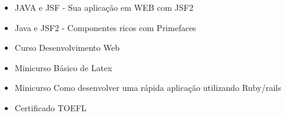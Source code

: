 












\smallskip
\begin{itemize}
\item JAVA e JSF - Sua aplicação em WEB com JSF2
\smallskip
\item  Java e JSF2  - Componentes ricos com Primefaces
\smallskip
\item Curso Desenvolvimento Web
\smallskip
\item Minicurso Básico de Latex
\smallskip
\item Minicurso Como desenvolver uma rápida aplicação utilizando
Ruby/rails
\smallskip
\item Certificado TOEFL
\smallskip

\end{itemize}
\bigskip


